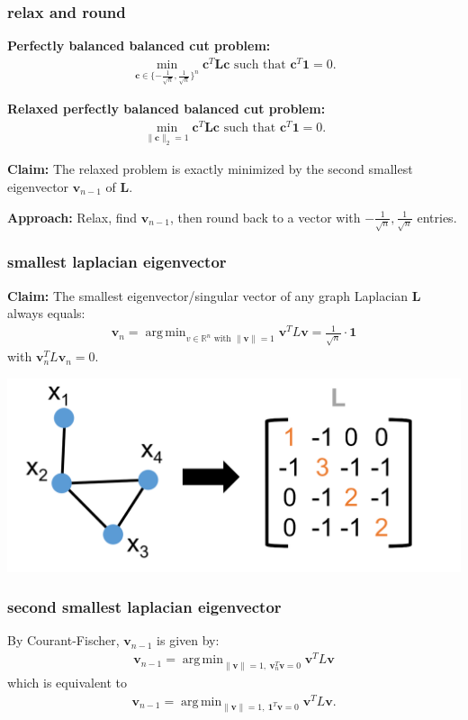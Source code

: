 \documentclass[compress]{beamer}
\newcommand{\bv}[1]{\mathbf{#1}}
\newcommand{\R}{\mathbb{R}}
\DeclareMathOperator*{\argmin}{arg\,min}
\newcommand{\norm}[1]{\|#1\|}
\begin{document}
\begin{frame}
	\frametitle{relax and round}
	\textbf{Perfectly balanced balanced cut problem:}
	\begin{align*}
		\min_{\bv{c} \in \{-\frac{1}{\sqrt{n}},\frac{1}{\sqrt{n}}\}^n} \bv{c}^T\bv{L}\bv{c} \text{ such that } \bv{c}^T\bv{1} = 0.
	\end{align*}

	\textbf{Relaxed perfectly balanced balanced cut problem:}
	\begin{align*}
		\min_{\|\bv{c}\|_2 = 1} \bv{c}^T\bv{L}\bv{c} \text{ such that } \bv{c}^T\bv{1} = 0.
	\end{align*}

	\textbf{Claim:} The relaxed problem is exactly minimized by the second smallest eigenvector $\bv{v}_{n-1}$ of $\bv{L}$. 

	\textbf{Approach:} Relax, find $\bv{v}_{n-1}$, then round back to a vector with $-\frac{1}{\sqrt{n}},\frac{1}{\sqrt{n}}$ entries.
\end{frame}




\begin{frame}[t]
	\frametitle{smallest laplacian eigenvector}
	\textbf{Claim:} The smallest eigenvector/singular vector of any graph Laplacian $\bv{L}$ always equals:
	\begin{align*}
	\bv{v}_n = \argmin_{v \in \R^n\text{ with } \norm{\bv{v}} = 1} \bv{v}^T L \bv{v} = \frac{1}{\sqrt{n}} \cdot \bv{1}
	\end{align*}
	with $\bv{v}_n^T  L \bv{v}_n = 0$. 
	
	\includegraphics[width=.5\textwidth]{laplace_compact.png}
\end{frame}

\begin{frame}
	\frametitle{second smallest laplacian eigenvector}
	By Courant-Fischer, $\bv{v}_{n-1}$ is given by:
	\begin{align*}
	\bv{v}_{n-1} = \argmin_{\norm{\bv{v}} = 1,\ {\bv{v}_n^T \bv{v} = 0}} \bv{v}^T L \bv{v}
	\end{align*}
	which is equivalent to
	\begin{align*}
		\bv{v}_{n-1} = \argmin_{\norm{\bv{v}} = 1,\ {\bv{1}^T \bv{v} = 0}} \bv{v}^T L \bv{v}.
	\end{align*}
\end{frame}
\end{document}
